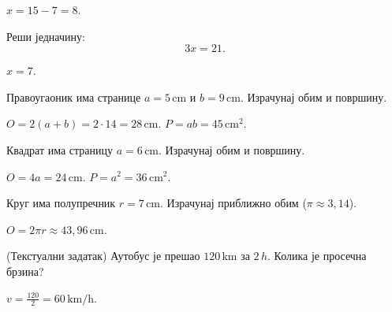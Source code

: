 \documentclass[11pt,a5paper,twoside,addpoints,answers]{exam}   %
\begin{document}
\begin{questions}
\begin{solution}[\stretch 1]
$x=15-7=8$.
\end{solution}

\question[8]
Реши једначину:
\[
3x=21.
\]

\begin{solution}[\stretch 1]
$x=7$.
\end{solution}

\ifprintanswers\else\newpage\fi

\question[8]
Правоугаоник има странице $a=5\,\text{cm}$ и $b=9\,\text{cm}$.  
Израчунај обим и површину.

\begin{solution}[\stretch 2]
$O=2(a+b)=2\cdot 14=28\,\text{cm}$.  
$P=ab=45\,\text{cm}^2$.
\end{solution}

\question[10]
Квадрат има страницу $a=6\,\text{cm}$.  
Израчунај обим и површину.

\begin{solution}[\stretch 2]
$O=4a=24\,\text{cm}$.  
$P=a^2=36\,\text{cm}^2$.
\end{solution}

\ifprintanswers\else\newpage\fi

\question[10]
Круг има полупречник $r=7\,\text{cm}$.  
Израчунај приближно обим ($\pi\approx3{,}14$).

\begin{solution}[\stretch 2]
$O=2\pi r \approx 43{,}96\,\text{cm}$.
\end{solution}

\question[10]
(Текстуални задатак) Аутобус је прешао $120\,\text{km}$ за $2\,h$.  
Колика је просечна брзина?

\begin{solution}[\stretch 2]
$v=\tfrac{120}{2}=60\,\text{km/h}$.
\end{solution}

\end{questions}
\end{document}
